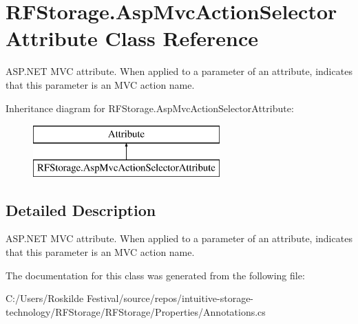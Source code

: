 \section{R\+F\+Storage.\+Asp\+Mvc\+Action\+Selector\+Attribute Class Reference}
\label{class_r_f_storage_1_1_asp_mvc_action_selector_attribute}


A\+S\+P.\+N\+ET M\+VC attribute. When applied to a parameter of an attribute, indicates that this parameter is an M\+VC action name.  


Inheritance diagram for R\+F\+Storage.\+Asp\+Mvc\+Action\+Selector\+Attribute\+:\begin{figure}[H]
\begin{center}
\leavevmode
\includegraphics[height=2.000000cm]{class_r_f_storage_1_1_asp_mvc_action_selector_attribute}
\end{center}
\end{figure}


\subsection{Detailed Description}
A\+S\+P.\+N\+ET M\+VC attribute. When applied to a parameter of an attribute, indicates that this parameter is an M\+VC action name. 


\begin{DoxyCode}{0}
\DoxyCodeLine{\}}
\end{DoxyCode}


The documentation for this class was generated from the following file\+:\begin{DoxyCompactItemize}
\item 
C\+:/\+Users/\+Roskilde Festival/source/repos/intuitive-\/storage-\/technology/\+R\+F\+Storage/\+R\+F\+Storage/\+Properties/Annotations.\+cs\end{DoxyCompactItemize}
